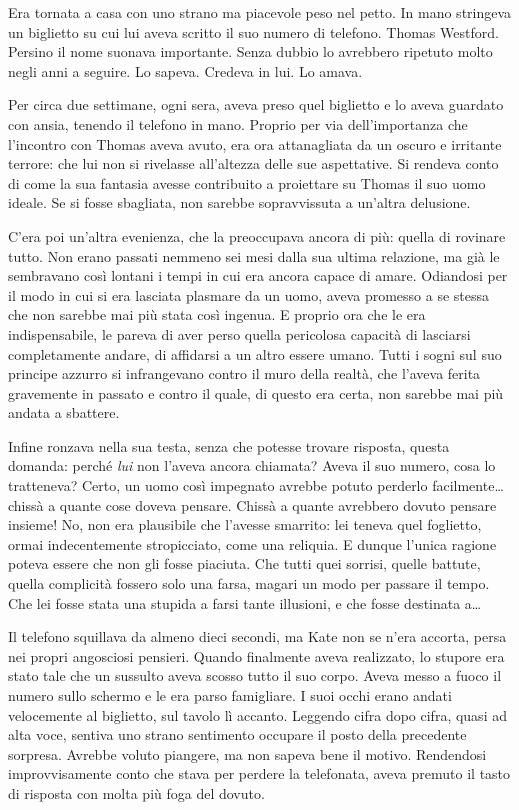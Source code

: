 \documentclass[a4paper,oneside,9pt]{memoir}
\begin{document}
Era tornata a casa con uno strano ma piacevole peso nel petto. In mano stringeva un biglietto su cui lui aveva scritto
il suo numero di telefono. Thomas Westford. Persino il nome suonava importante. Senza dubbio lo avrebbero ripetuto molto
negli anni a seguire. Lo sapeva. Credeva in lui. Lo amava.

Per circa due settimane, ogni sera, aveva preso quel biglietto e lo aveva guardato con ansia, tenendo il telefono in
mano. Proprio per via dell'importanza che l'incontro con Thomas aveva avuto, era ora attanagliata da un oscuro e
irritante terrore: che lui non si rivelasse all'altezza delle sue aspettative. Si rendeva conto di come la sua fantasia
avesse contribuito a proiettare su Thomas il suo uomo ideale. Se si fosse sbagliata, non sarebbe sopravvissuta a
un'altra delusione.

C'era poi un'altra evenienza, che la preoccupava ancora di più: quella di rovinare tutto. Non erano passati nemmeno sei
mesi dalla sua ultima relazione, ma già le sembravano così lontani i tempi in cui era ancora capace di amare. Odiandosi
per il modo in cui si era lasciata plasmare da un uomo, aveva promesso a se stessa che non sarebbe mai più stata così
ingenua. E proprio ora che le era indispensabile, le pareva di aver perso quella pericolosa capacità di lasciarsi
completamente andare, di affidarsi a un altro essere umano. Tutti i sogni sul suo principe azzurro si infrangevano
contro il muro della realtà, che l'aveva ferita gravemente in passato e contro il quale, di questo era certa, non
sarebbe mai più andata a sbattere.

Infine ronzava nella sua testa, senza che potesse trovare risposta, questa domanda: perché \emph{lui} non l'aveva ancora
chiamata? Aveva il suo numero, cosa lo tratteneva? Certo, un uomo così impegnato avrebbe potuto perderlo
facilmente\dots{} chissà a quante cose doveva pensare. Chissà a quante avrebbero dovuto pensare insieme! No, non era
plausibile che l'avesse smarrito: lei teneva quel foglietto, ormai indecentemente stropicciato, come una reliquia. E
dunque l'unica ragione poteva essere che non gli fosse piaciuta. Che tutti quei sorrisi, quelle battute, quella
complicità fossero solo una farsa, magari un modo per passare il tempo. Che lei fosse stata una stupida a farsi tante
illusioni, e che fosse destinata a\dots{}

Il telefono squillava da almeno dieci secondi, ma Kate non se n'era accorta, persa nei propri angosciosi pensieri.
Quando finalmente aveva realizzato, lo stupore era stato tale che un sussulto aveva scosso tutto il suo corpo. Aveva
messo a fuoco il numero sullo schermo e le era parso famigliare. I suoi occhi erano andati velocemente al biglietto, sul
tavolo lì accanto. Leggendo cifra dopo cifra, quasi ad alta voce, sentiva uno strano sentimento occupare il posto della
precedente sorpresa. Avrebbe voluto piangere, ma non sapeva bene il motivo. Rendendosi improvvisamente conto che stava
per perdere la telefonata, aveva premuto il tasto di risposta con molta più foga del dovuto.
\end{document}
